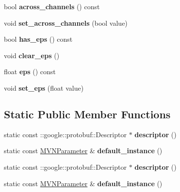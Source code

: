 \begin{DoxyCompactItemize}
bool {\bfseries across\+\_\+channels} () const
\item 
\mbox{\label{classcaffe_1_1_m_v_n_parameter_a54f1bdc63ea884d8ec31c229156861f8}} 
void {\bfseries set\+\_\+across\+\_\+channels} (bool value)
\item 
\mbox{\label{classcaffe_1_1_m_v_n_parameter_a59c55afb12d985714571ccdf100fc066}} 
bool {\bfseries has\+\_\+eps} () const
\item 
\mbox{\label{classcaffe_1_1_m_v_n_parameter_acc8f0ce43c0f328dd7a94704e9589c50}} 
void {\bfseries clear\+\_\+eps} ()
\item 
\mbox{\label{classcaffe_1_1_m_v_n_parameter_ab34d24cea6da4fb66e104d1bd0f8bcdf}} 
float {\bfseries eps} () const
\item 
\mbox{\label{classcaffe_1_1_m_v_n_parameter_a59b2af73b2cf0bb0aa3267da650cd59a}} 
void {\bfseries set\+\_\+eps} (float value)
\end{DoxyCompactItemize}
\subsection*{Static Public Member Functions}
\begin{DoxyCompactItemize}
\item 
\mbox{\label{classcaffe_1_1_m_v_n_parameter_abcc305dd5b17fbd44b5989a823a10db9}} 
static const \+::google\+::protobuf\+::\+Descriptor $\ast$ {\bfseries descriptor} ()
\item 
\mbox{\label{classcaffe_1_1_m_v_n_parameter_a7039ecb18bd4e4116f1e18d4d2cd7fb0}} 
static const \mbox{\hyperlink{classcaffe_1_1_m_v_n_parameter}{M\+V\+N\+Parameter}} \& {\bfseries default\+\_\+instance} ()
\item 
\mbox{\label{classcaffe_1_1_m_v_n_parameter_af5b024dffed6934b847f4af9c2ca61fb}} 
static const \+::google\+::protobuf\+::\+Descriptor $\ast$ {\bfseries descriptor} ()
\item 
\mbox{\label{classcaffe_1_1_m_v_n_parameter_a049cb3cc7aa8018ca38cc4d120054906}} 
static const \mbox{\hyperlink{classcaffe_1_1_m_v_n_parameter}{M\+V\+N\+Parameter}} \& {\bfseries default\+\_\+instance} ()
\end{DoxyCompactItemize}

